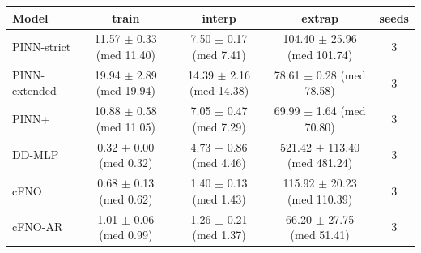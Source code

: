 \begin{tabular}{lcccc}
\toprule
Model & train & interp & extrap & seeds \\
\midrule
PINN-strict & 11.57 $\pm$ 0.33 (med 11.40) & 7.50 $\pm$ 0.17 (med 7.41) & 104.40 $\pm$ 25.96 (med 101.74) & 3 \\
PINN-extended & 19.94 $\pm$ 2.89 (med 19.94) & 14.39 $\pm$ 2.16 (med 14.38) & 78.61 $\pm$ 0.28 (med 78.58) & 3 \\
PINN+ & 10.88 $\pm$ 0.58 (med 11.05) & 7.05 $\pm$ 0.47 (med 7.29) & 69.99 $\pm$ 1.64 (med 70.80) & 3 \\
DD-MLP & 0.32 $\pm$ 0.00 (med 0.32) & 4.73 $\pm$ 0.86 (med 4.46) & 521.42 $\pm$ 113.40 (med 481.24) & 3 \\
cFNO & 0.68 $\pm$ 0.13 (med 0.62) & 1.40 $\pm$ 0.13 (med 1.43) & 115.92 $\pm$ 20.23 (med 110.39) & 3 \\
cFNO-AR & 1.01 $\pm$ 0.06 (med 0.99) & 1.26 $\pm$ 0.21 (med 1.37) & 66.20 $\pm$ 27.75 (med 51.41) & 3 \\
\bottomrule
\end{tabular}
